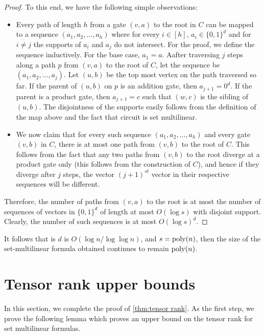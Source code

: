 \begin{proof}
To this end, we have the following simple observations:
\begin{itemize}
\item Every path of length $h$ from a gate $(v, a)$ to the root in $C$ can be mapped to a sequence $(a_1, a_2, \ldots, a_h)$ where for every $i \in [h]$, $a_i \in \{0,1\}^d$ and for $i\neq j$ the supports of $a_i$ and $a_j$ do not intersect. For the proof, we define the sequence inductively. For the base case, $a_1 = a$. Aafter traversing $j$ steps along a path $p$ from $(v,a)$ to the root of $C$, let the sequence be $(a_1, a_2, \ldots, a_j)$. Let $(u, b)$ be the top most vertex on the path traversed so far. If  the parent of $(u, b)$ on $p$ is an addition gate, then $a_{j+1} = 0^d$. If the parent is a product gate, then $a_{j+1} = c$ such that $(w,c)$ is the sibling of $(u,b)$. The disjointness of the supports easily follows from the definition of the map above and the fact that circuit is set multilinear.

\item We now claim that for every such sequence $(a_1, a_2, \ldots, a_h)$ and every gate $(v,b)$ in $C$, there is at most one path from $(v,b)$ to the root of $C$. This follows from the fact that any two paths from $(v,b)$ to the root diverge at a product gate only (this follows from the construction of $C$), and hence if they diverge after $j$ steps, the vector $(j+1)^{st}$ vector in their respective sequences will be different.  
\end{itemize}

Therefore, the number of paths from $(v,a)$ to the root is at most the number of sequences of   vectors in $\{0,1\}^d$ of length at most $O(\log s)$ with disjoint support. Clearly, the number of such sequences is at most $O(\log s)^d$. 
\end{proof}

\begin{remark} 
It follows that is $d$ is $O\left(\log n/\log \log n\right)$, and $s = \operatorname{poly}(n)$, then the size of the set-multilinear formula obtained continues to remain $\operatorname{poly}(n)$. 
\end{remark}
\section{Tensor rank upper bounds}

In this section, we complete the proof of \autoref{thm:tensor rank}. As the first step, we prove the following lemma which proves an upper bound on the tensor rank for set multilinear formulas.

